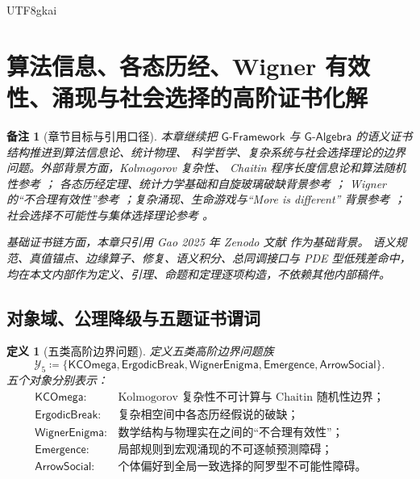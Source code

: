 \documentclass[12pt]{article}
\newtheorem{definition}{定义}[section]
\newtheorem{remark}{备注}[section]
\newcommand{\GFramework}{\textsf{G-Framework}}
\newcommand{\GAlgebra}{\textsf{G-Algebra}}
\newcommand{\DefEq}{\coloneqq}
\begin{document}
\begin{CJK*}{UTF8}{gkai}
\section{算法信息、各态历经、Wigner 有效性、涌现与社会选择的高阶证书化解}
\label{sec:tex59-philosophy-complexity-frontier}

\begin{remark}[章节目标与引用口径]
本章继续把 \(\GFramework{}\) 与 \(\GAlgebra{}\) 的语义证书结构推进到算法信息论、统计物理、
科学哲学、复杂系统与社会选择理论的边界问题。外部背景方面，Kolmogorov 复杂性、
Chaitin 程序长度信息论和算法随机性参考 \cite{Kolmogorov1965Info,Chaitin1975ProgramSize,LiVitanyi2008Kolmogorov}；
各态历经定理、统计力学基础和自旋玻璃破缺背景参考
\cite{Birkhoff1931Ergodic,Khinchin1949StatMech,MezardParisiVirasoro1987SpinGlass}；
Wigner 的“不合理有效性”参考 \cite{Wigner1960Effectiveness}；复杂涌现、生命游戏与“More is different”
背景参考 \cite{Gardner1970LifeGame,Anderson1972MoreIsDifferent,Holland1998Emergence}；
社会选择不可能性与集体选择理论参考 \cite{Arrow1951SocialChoice,Sen1970CollectiveChoice}。

基础证书链方面，本章只引用 Gao 2025 年 Zenodo 文献 \cite{Gao2025PureMathZenodo} 作为基础背景。
语义规范、真值锚点、边缘算子、修复、语义积分、总同调接口与 PDE 型低残差命中，
均在本文内部作为定义、引理、命题和定理逐项构造，不依赖其他内部稿件。
\end{remark}

\subsection{对象域、公理降级与五题证书谓词}
\label{subsec:tex59-y5-objects}

\begin{definition}[五类高阶边界问题]
\label{def:tex59-y5-objects}
定义五类高阶边界问题族
\[
  \mathcal Y_5
  \DefEq
  \{
  \mathsf{KCOmega},
  \mathsf{ErgodicBreak},
  \mathsf{WignerEnigma},
  \mathsf{Emergence},
  \mathsf{ArrowSocial}
  \}.
\]
五个对象分别表示：
\[
\begin{array}{ll}
  \mathsf{KCOmega}:& \text{Kolmogorov 复杂性不可计算与 Chaitin 随机性边界；}\\
  \mathsf{ErgodicBreak}:& \text{复杂相空间中各态历经假说的破缺；}\\
  \mathsf{WignerEnigma}:& \text{数学结构与物理实在之间的“不合理有效性”；}\\
  \mathsf{Emergence}:& \text{局部规则到宏观涌现的不可逐帧预测障碍；}\\
  \mathsf{ArrowSocial}:& \text{个体偏好到全局一致选择的阿罗型不可能性障碍。}
\end{array}
\]
\end{definition}


\end{CJK*}
\end{document}
